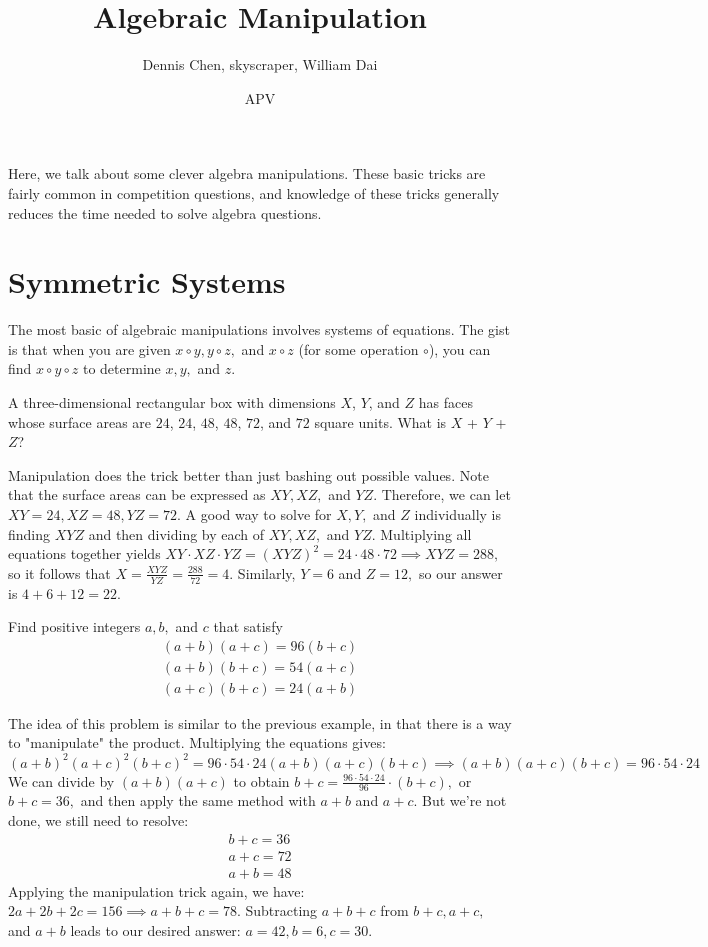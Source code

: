 \documentclass{article}
\title{Algebraic Manipulation}
\author{Dennis Chen, skyscraper, William Dai}
\date{APV}
\begin{document}
\maketitle

Here, we talk about some clever algebra manipulations. These basic tricks are fairly common in competition questions, and knowledge of these tricks generally reduces the time needed to solve algebra questions.

\section{Symmetric Systems}

The most basic of algebraic manipulations involves systems of equations. The gist is that when you are given $x\circ y,y\circ z,$ and $x\circ z$ (for some operation $\circ$), you can find $x \circ y \circ z$ to determine $x,y,$ and $z.$
\begin{exam}[2018 AMC 10B/4]
A three-dimensional rectangular box with dimensions $X$, $Y$, and $Z$ has faces whose surface areas are $24$, $24$, $48$, $48$, $72$, and $72$ square units. What is $X$ + $Y$ + $Z$?
\end{exam}
\begin{sol}
Manipulation does the trick better than just bashing out possible values. Note that the surface areas can be expressed as $XY,XZ,$ and $YZ.$ Therefore, we can let $XY = 24, XZ = 48, YZ = 72.$ A good way to solve for $X,Y,$ and $Z$ individually is finding $XYZ$ and then dividing by each of $XY, XZ,$ and $YZ.$ Multiplying all equations together yields $XY \cdot XZ \cdot YZ = (XYZ)^2 = 24 \cdot 48 \cdot 72 \implies XYZ = 288,$ so it follows that $X = \frac{XYZ}{YZ} = \frac{288}{72} = 4.$ Similarly, $Y = 6$ and $Z=12,$ so our answer is $4+6+12= 22.$
\end{sol}
\begin{exam}[Classic]
Find positive integers $a,b,$ and $c$ that satisfy
\begin{align*}
(a+b)(a+c)=96(b+c) \\
(a+b)(b+c)=54(a+c) \\
(a+c)(b+c)=24(a+b)
\end{align*}
\end{exam}

\begin{sol}
The idea of this problem is similar to the previous example, in that there is a way to "manipulate" the product. Multiplying the equations gives: 
\[(a+b)^2(a+c)^2(b+c)^2 = 96 \cdot 54 \cdot 24(a+b)(a+c)(b+c)\implies (a+b)(a+c)(b+c)= 96 \cdot 54 \cdot 24\]
We can divide by $(a+b)(a+c)$ to obtain $b+c = \frac{96 \cdot 54 \cdot 24}{96} \cdot (b+c),$ or $b+c = 36,$ and then apply the same method with $a+b$ and $a+c.$ But we're not done, we still need to resolve:
\begin{align*}
b+c = 36 \\
a+c = 72\\
a+b = 48
\end{align*}
Applying the manipulation trick again, we have: $2a +2b+2c = 156 \implies a+b+c = 78.$ Subtracting $a+b+c$ from $b+c,a+c,$ and $a+b$ leads to our desired answer: $a = 42, b = 6, c = 30.$
\end{sol}
\end{document}
